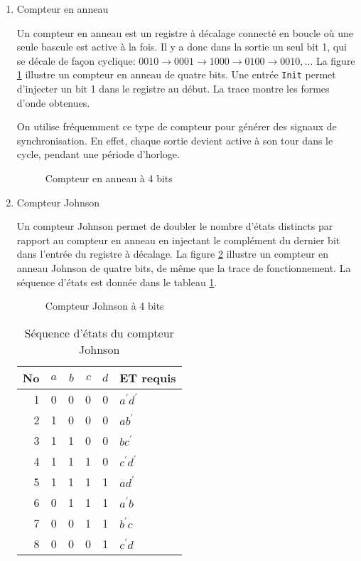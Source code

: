 \documentclass[letter, oneside]{book}
\begin{document}
\begin{enumerate}
\item Compteur en anneau
\label{sec:org1ebe35d}

Un compteur en anneau est un registre à décalage connecté en boucle où
une seule bascule est active à la fois. Il y a donc dans la sortie un
seul bit 1, qui se décale de façon cyclique: \(0010 \rightarrow 0001
\rightarrow 1000 \rightarrow 0100 \rightarrow 0010, \ldots\) La
figure \ref{fig:org44fbda9} illustre un compteur en anneau de quatre bits. Une
entrée \texttt{Init} permet d'injecter un bit 1 dans le registre au début. La
trace montre les formes d'onde obtenues.

On utilise fréquemment ce type de compteur pour générer des signaux de
synchronisation. En effet, chaque sortie devient active à son tour
dans le cycle, pendant une période d'horloge.

\begin{figure}[htbp]
\centering

\caption{\label{fig:org44fbda9}Compteur en anneau à 4 bits}
\end{figure}

\item Compteur Johnson
\label{sec:org32d17ee}

Un compteur Johnson permet de doubler le nombre d'états distincts par
rapport au compteur en anneau en injectant le complément du dernier
bit dans l'entrée du registre à décalage.  La figure \ref{fig:orge39f969}
illustre un compteur en anneau Johnson de quatre bits, de même que la
trace de fonctionnement. La séquence d'états est donnée dans le
tableau \ref{tab:org69eccee}.


\begin{figure}[htbp]
\centering

\caption{\label{fig:orge39f969}Compteur Johnson à 4 bits}
\end{figure}


\begin{table}[htbp]
\caption{\label{tab:org69eccee}Séquence d'états du compteur Johnson}
\centering
\begin{tabular}{rrrrrl}
No & \(a\) & \(b\) & \(c\) & \(d\) & ET requis\\[0pt]
\hline
1 & 0 & 0 & 0 & 0 & \(a^\prime d^\prime\)\\[0pt]
2 & 1 & 0 & 0 & 0 & \(a b^\prime\)\\[0pt]
3 & 1 & 1 & 0 & 0 & \(b c^\prime\)\\[0pt]
4 & 1 & 1 & 1 & 0 & \(c^\prime d^\prime\)\\[0pt]
5 & 1 & 1 & 1 & 1 & \(a d^\prime\)\\[0pt]
6 & 0 & 1 & 1 & 1 & \(a^\prime b\)\\[0pt]
7 & 0 & 0 & 1 & 1 & \(b^\prime c\)\\[0pt]
8 & 0 & 0 & 0 & 1 & \(c^\prime d\)\\[0pt]
\end{tabular}
\end{table}



\end{enumerate}
\end{document}
